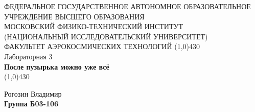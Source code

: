 \documentclass[a4paper,12pt]{article}
\begin{document}
\begin{titlepage}
\begin{center}
\large{\small ФЕДЕРАЛЬНОЕ ГОСУДАРСТВЕННОЕ АВТОНОМНОЕ ОБРАЗОВАТЕЛЬНОЕ\\ УЧРЕЖДЕНИЕ ВЫСШЕГО ОБРАЗОВАНИЯ \\ МОСКОВСКИЙ ФИЗИКО-ТЕХНИЧЕСКИЙ ИНСТИТУТ\\ (НАЦИОНАЛЬНЫЙ ИССЛЕДОВАТЕЛЬСКИЙ УНИВЕРСИТЕТ)\\ ФАКУЛЬТЕТ АЭРОКОСМИЧЕСКИХ ТЕХНОЛОГИЙ}
\vfill
\line(1,0){430}\\[1mm]
\huge{Лабораторная 3}\\
\huge\textbf{После пузырька можно уже всё}\\
\line(1,0){430}\\[1mm]
\vfill
\begin{flushright}
\normalsize{Рогозин Владимир}\\
\normalsize{\textbf{Группа Б03-106}}\\
\end{flushright}
\end{center}
\end{titlepage}
\end{document}
